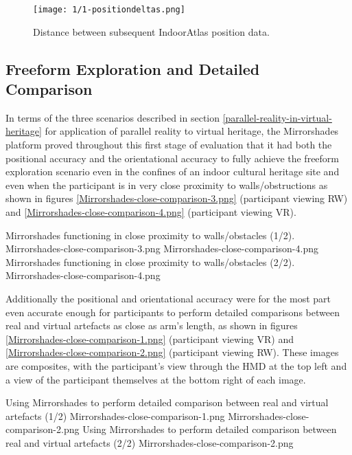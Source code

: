 \begin{figure}[ht]
	\begin{center}
		\texttt{[image: 1/1-positiondeltas.png]}
		\caption{Distance between subsequent IndoorAtlas position data.}
		\label{1-positiondeltas.png}
	\end{center}
\end{figure}


\subsection{Freeform Exploration and Detailed Comparison}

In terms of the three scenarios described in section \ref{parallel-reality-in-virtual-heritage} for application of parallel reality to virtual heritage, the Mirrorshades platform proved throughout this first stage of evaluation that it had both the positional accuracy and the orientational accuracy to fully achieve the freeform exploration scenario even in the confines of an indoor cultural heritage site and even when the participant is in very close proximity to walls/obstructions as shown in figures \ref{Mirrorshades-close-comparison-3.png} (participant viewing RW) and \ref{Mirrorshades-close-comparison-4.png} (participant viewing VR).

 {Mirrorshades functioning in close proximity to walls/obstacles (1/2).} {Mirrorshades-close-comparison-3.png}
       {Mirrorshades-close-comparison-4.png} {Mirrorshades functioning in close proximity to walls/obstacles (2/2).} {Mirrorshades-close-comparison-4.png}

Additionally the positional and orientational accuracy were for the most part even accurate enough for participants to perform detailed comparisons between real and virtual artefacts as close as arm's length, as shown in figures \ref{Mirrorshades-close-comparison-1.png} (participant viewing VR) and \ref{Mirrorshades-close-comparison-2.png} (participant viewing RW). These images are composites, with the participant's view through the HMD at the top left and a view of the participant themselves at the bottom right of each image.

 {Using Mirrorshades to perform detailed comparison between real and virtual artefacts (1/2)} {Mirrorshades-close-comparison-1.png}
       {Mirrorshades-close-comparison-2.png} {Using Mirrorshades to perform detailed comparison between real and virtual artefacts (2/2)} {Mirrorshades-close-comparison-2.png}

